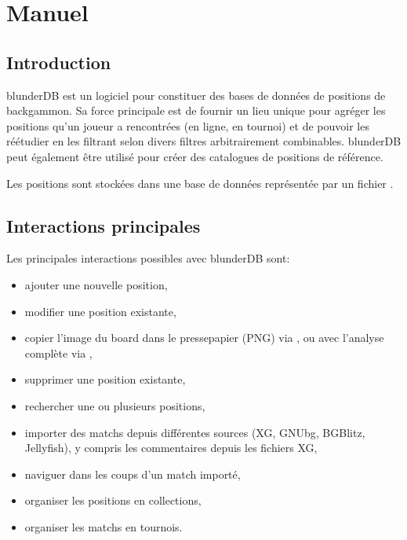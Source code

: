\documentclass[letterpaper,10pt,french]{sphinxmanual}
\begin{document}
\sphinxstepscope


\section{Manuel}
\label{\detokenize{manuel:manuel}}\label{\detokenize{manuel:id1}}\label{\detokenize{manuel::doc}}

\subsection{Introduction}
\label{\detokenize{manuel:introduction}}
\sphinxAtStartPar
blunderDB est un logiciel pour constituer des bases de données de
positions de backgammon. Sa force principale est de fournir un lieu unique
pour agréger les positions qu’un joueur a rencontrées (en ligne, en tournoi)
et de pouvoir les réétudier en les filtrant selon divers filtres arbitrairement
combinables. blunderDB peut également être utilisé pour créer des catalogues
de positions de référence.

\sphinxAtStartPar
Les positions sont stockées dans une base de données représentée par un fichier
.


\subsection{Interactions principales}
\label{\detokenize{manuel:interactions-principales}}
\sphinxAtStartPar
Les principales interactions possibles avec blunderDB sont:
\begin{itemize}
\item {} 
\sphinxAtStartPar
ajouter une nouvelle position,

\item {} 
\sphinxAtStartPar
modifier une position existante,

\item {} 
\sphinxAtStartPar
copier l’image du board dans le presse\sphinxhyphen{}papier (PNG) via , ou avec l’analyse complète via ,

\item {} 
\sphinxAtStartPar
supprimer une position existante,

\item {} 
\sphinxAtStartPar
rechercher une ou plusieurs positions,

\item {} 
\sphinxAtStartPar
importer des matchs depuis différentes sources (XG, GNUbg, BGBlitz, Jellyfish), y compris les commentaires depuis les fichiers XG,

\item {} 
\sphinxAtStartPar
naviguer dans les coups d’un match importé,

\item {} 
\sphinxAtStartPar
organiser les positions en collections,

\item {} 
\sphinxAtStartPar
organiser les matchs en tournois.

\end{itemize}
\end{document}
